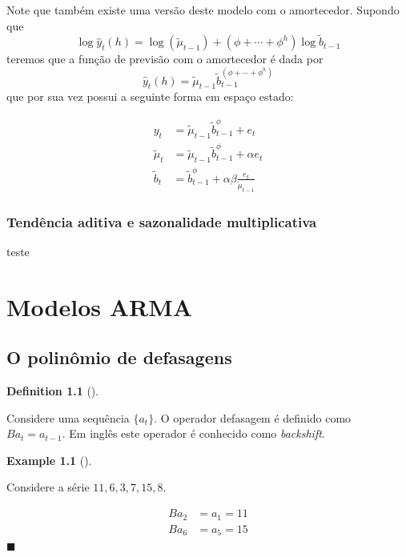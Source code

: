 \documentclass[
  letterpaper,
  DIV=11,
  numbers=noendperiod]{scrreprt}
\theoremstyle{definition}
\newtheorem{example}{Example}[chapter]
\theoremstyle{plain}
\theoremstyle{definition}
\newtheorem{definition}{Definition}[chapter]
\theoremstyle{plain}
\theoremstyle{remark}
\begin{document}
Note que também existe uma versão deste modelo com o amortecedor.
Supondo que
\[\log \hat{y}_t(h)=\log(\tilde{\mu}_{t-1})+(\phi+\cdots+\phi^h)\log\tilde{b}_{t-1}\]
teremos que a função de previsão com o amortecedor é dada por
\[\hat{y}_t(h)=\tilde{\mu}_{t-1}\tilde{b}_{t-1}^{(\phi+\cdots+\phi^h)}\]
que por sua vez possui a seguinte forma em espaço estado:

\[\begin{align}
y_t&=\tilde{\mu}_{t-1}\tilde{b}_{t-1}^\phi+e_t\\
\tilde{\mu}_t&=\tilde{\mu}_{t-1}\tilde{b}_{t-1}^\phi+\alpha e_t\\
\tilde{b}_t&=\tilde{b}_{t-1}^\phi+\alpha\beta\frac{e_t}{\tilde{\mu}_{t-1}}
\end{align}\]

\hypertarget{tenduxeancia-aditiva-e-sazonalidade-multiplicativa}{%
\subsection{Tendência aditiva e sazonalidade
multiplicativa}\label{tenduxeancia-aditiva-e-sazonalidade-multiplicativa}}

teste


\hypertarget{modelos-arma}{%
\chapter{Modelos ARMA}\label{modelos-arma}}

\hypertarget{o-polinuxf4mio-de-defasagens}{%
\section{O polinômio de defasagens}\label{o-polinuxf4mio-de-defasagens}}

\begin{definition}[]\protect\hypertarget{def-}{}\label{def-}

Considere uma sequência \(\{a_t\}\). O operador defasagem é definido
como \(Ba_t = a_{t-1}\). Em inglês este operador é conhecido como
\emph{backshift}.

\end{definition}

\begin{example}[]\protect\hypertarget{exm-example}{}\label{exm-example}

Considere a série \(11,6,3,7,15,8\).

\[\begin{align*}
     Ba_2 &= a_{1}=11\\
     B a_6& =a_5 =15
    \end{align*}\] \(\blacksquare\)

\end{example}
\end{document}
